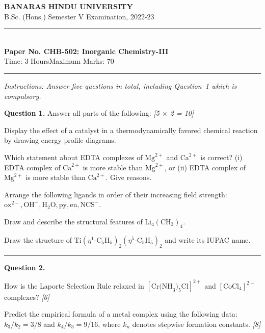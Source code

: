\documentclass[11pt,a4paper]{article}
\newcommand{\pts}[1]{\hfill   \textit{[#1]}}
\begin{document}
\begin{center}
  {\large\bfseries BANARAS HINDU UNIVERSITY}\\[2pt]
  {\normalsize B.Sc. (Hons.) Semester V Examination, 2022-23}\\[6pt]
  \rule{0.8\linewidth}{0.5pt}\\[6pt]
  {\large\bfseries Paper No. CHB-502: Inorganic Chemistry-III}\\[4pt]
  {\normalsize Time: 3 Hours\hfill Maximum Marks: 70}
\end{center}
\rule{\linewidth}{0.4pt}
\small



\noindent   \textit{Instructions: Answer five questions in total, including Question~1 which is compulsory.}

\normalsize
\bigskip




\noindent   \textbf{Question 1.} Answer all parts of the following: \pts{5 $ \times$ 2 = 10}

\begin{parts}
  \item Display the effect of a catalyst in a thermodynamically favored chemical reaction by drawing energy profile diagrams.
  \item Which statement about EDTA complexes of $ \text{Mg}^{2+}$ and $ \text{Ca}^{2+}$ is correct? (i) EDTA complex of $ \text{Ca}^{2+}$ is more stable than $ \text{Mg}^{2+}$, or (ii) EDTA complex of $ \text{Mg}^{2+}$ is more stable than $ \text{Ca}^{2+}$. Give reasons.
  \item Arrange the following ligands in order of their increasing field strength: $ \text{ox}^{2-},  \text{OH}^-,  \text{H}_2 \text{O},  \text{py},  \text{en},  \text{NCS}^-$.
  \item Draw and describe the structural features of $ \text{Li}_4( \text{CH}_3)_4$.
  \item Draw the structure of $ \text{Ti}(\eta^1 \text{-C}_5 \text{H}_5)_2(\eta^5 \text{-C}_5 \text{H}_5)_2$ and write its IUPAC name.
\end{parts}

\medskip\rule{\linewidth}{0.2pt}




\noindent   \textbf{Question 2.}

\begin{parts}
  \item How is the Laporte Selection Rule relaxed in $[ \text{Cr(NH}_3)_5 \text{Cl}]^{2+}$ and $[ \text{CoCl}_4]^{2-}$ complexes? \pts{6}
  \item Predict the empirical formula of a metal complex using the following data: $k_3/k_2 = 3/8$ and $k_4/k_3 = 9/16$, where $k_n$ denotes stepwise formation constants. \pts{8}
\end{parts}
\end{document}
